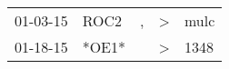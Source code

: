 \begin{supertabular}{lllll}
 01-03-15 &   ROC2 &  , &  \textgreater &  mulc \\
 01-18-15 &  *OE1* &    &  \textgreater &  1348 \\
\end{supertabular}
